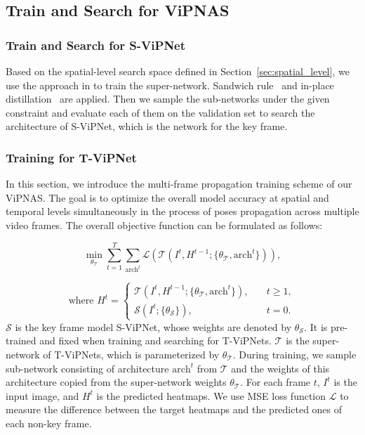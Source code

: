 \documentclass[final]{cvpr}
\begin{document}
\subsection{Train and Search for ViPNAS}


\subsubsection{Train and Search for S-ViPNet}
Based on the spatial-level search space defined in Section~\ref{sec:spatial_level}, we use the approach in \cite{yu2020bignas} to train the super-network. Sandwich rule~\cite{yu2019universally,yu2020bignas} and in-place distillation~\cite{yu2019universally,yu2020bignas} are applied. Then we sample the sub-networks under the given constraint and evaluate each of them on the validation set to search the architecture of S-ViPNet, which is the network for the key frame. 

\subsubsection{Training for T-ViPNet}
\label{sec:train_tvip}
In this section, we introduce the multi-frame propagation training scheme of our ViPNAS. The goal is to optimize the overall model accuracy at spatial and temporal levels simultaneously in the process of poses propagation across multiple video frames. The overall objective function can be formulated as follows:


\begin{equation}
    \min_{\theta_\mathcal{T}} \sum_{t=1}^T \sum_{\textrm{arch}^t} \mathcal{L}(\mathcal{T}(I^t, H^{t-1} ; \{\theta_\mathcal{T}, \textrm{arch}^t\})),
\label{eq:train_obj}
\end{equation}

\begin{equation}
\textrm{where }  H^{t} = 
\begin{cases}
\mathcal{T}(I^t, H^{t-1} ; \{\theta_\mathcal{T}, \textrm{arch}^t\}),& \quad t\geq 1, \\
\mathcal{S}(I^t ; \{\theta_\mathcal{S}\}), &\quad t = 0.
\end{cases}
\end{equation}
$\mathcal{S}$ is the key frame model S-ViPNet, whose weights are denoted by $\theta_\mathcal{S}$. It is pre-trained and fixed when training and searching for T-ViPNets. $\mathcal{T}$ is the super-network of T-ViPNets, which is parameterized by $\theta_\mathcal{T}$. During training, we sample sub-network consisting of architecture $\textrm{arch}^t$  from $\mathcal{T}$ and the weights of this architecture copied from the super-network weights $\theta_\mathcal{T}$. 
For each frame $t$, $I^t$ is the input image, and $H^t$ is the predicted heatmaps. We use MSE loss function $\mathcal{L}$ to measure the difference between the target heatmaps and the predicted ones of each non-key frame.
\end{document}
